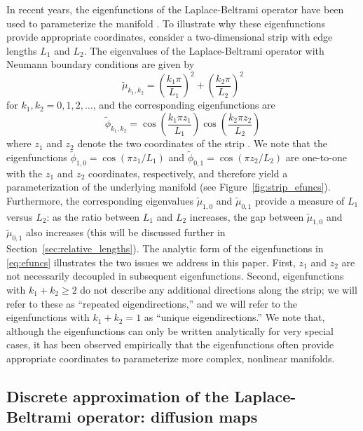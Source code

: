 \documentclass[preprint]{elsarticle}
\begin{document}
In recent years, the eigenfunctions of the Laplace-Beltrami operator have been used to parameterize the manifold \cite{Belkin2003, coifman2005geometric, singer2008non}. 
%
To illustrate why these eigenfunctions provide appropriate coordinates, consider a two-dimensional strip with edge lengths $L_1$ and $L_2$. 
%
The eigenvalues of the Laplace-Beltrami operator with Neumann boundary conditions are given by
\begin{equation} \label{eq:evals}
\tilde{\mu}_{k_1, k_2} = \left( \frac{k_1 \pi}{L_1} \right)^2 + \left( \frac{k_2 \pi}{L_2} \right)^2
\end{equation}
for $k_1, k_2 = 0, 1, 2, \dots$,
and the corresponding eigenfunctions are 
\begin{equation} \label{eq:efuncs}
\tilde{\phi}_{k_1, k_2} = \cos \left( \frac{k_1 \pi z_1}{L_1} \right) \cos \left( \frac{k_2 \pi z_2}{L_2} \right)
\end{equation}
where $z_1$ and $z_2$ denote the two coordinates of the strip \cite{singer2008non}. 
%
We note that the eigenfunctions $\tilde{\phi}_{1, 0} = \cos \left( {\pi z_1}/{L_1} \right)$ and $\tilde{\phi}_{0, 1} = \cos \left( {\pi z_2}/{L_2} \right)$ are one-to-one with the $z_1$ and $z_2$ coordinates, respectively, and therefore yield a parameterization of the underlying manifold (see Figure~\ref{fig:strip_efuncs}). 
%
Furthermore, the corresponding eigenvalues $\tilde{\mu}_{1,0}$ and $\tilde{\mu}_{0,1}$ provide a measure of $L_1$ versus $L_2$: as the ratio between $L_1$ and $L_2$ increases, the gap between $\tilde{\mu}_{1,0}$ and $\tilde{\mu}_{0,1}$ also increases (this will be discussed further in Section~\ref{sec:relative_lengths}).
%
The analytic form of the eigenfunctions in \eqref{eq:efuncs} illustrates the two issues we address in this paper. 
%
First, $z_1$ and $z_2$ are not necessarily decoupled in subsequent eigenfunctions. 
%
Second, eigenfunctions with $k_1+k_2 \ge 2$ do not describe any additional directions along the strip; we will refer to these as ``repeated eigendirections,'' and we will refer to the eigenfunctions with $k_1+k_2 =1$ as ``unique eigendirections.''
%
We note that, although the eigenfunctions can only be written analytically for very special cases, it has been observed empirically that the eigenfunctions often provide appropriate coordinates to parameterize more complex, nonlinear manifolds. 


\subsection{Discrete approximation of the Laplace-Beltrami operator: diffusion maps}
\end{document}
